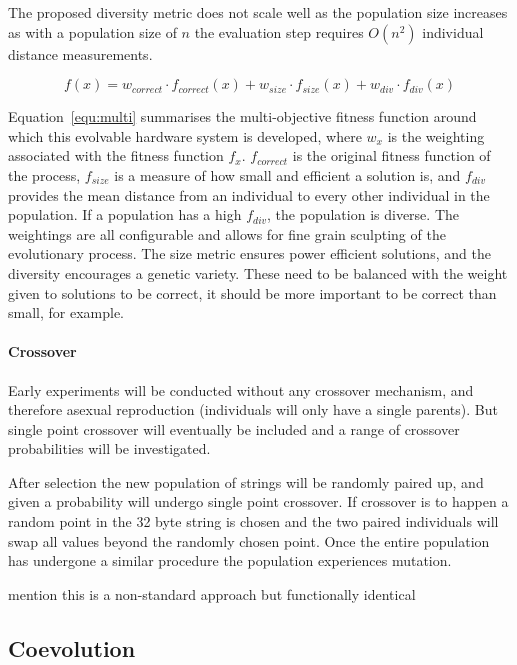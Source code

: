 The proposed diversity metric does not scale well as the population size increases
as with a population size of $n$ the evaluation step requires $O(n^2)$ individual
distance measurements.

\begin{equation}
	\label{equ:multi}
	f(x) = w_{correct} \cdot f_{correct}(x) + w_{size} \cdot f_{size}(x) +
	w_{div} \cdot f_{div}(x)
\end{equation}

Equation~\ref{equ:multi} summarises the multi-objective fitness function around
which this evolvable hardware system is developed, where $w_x$ is the weighting
associated with the fitness function $f_x$. $f_{correct}$ is the original fitness
function of the process, $f_{size}$ is a measure of how small and efficient a
solution is, and $f_{div}$ provides the mean distance from an individual to
every other individual in the population. If a population has a high $f_{div}$,
the population is diverse.
The weightings are all
configurable and allows for fine grain sculpting of the evolutionary process.
The size metric ensures power efficient solutions, and the diversity encourages
a genetic variety. These need to be balanced with the weight given to solutions
to be correct, it should be more important to be correct than small, for example.

\paragraph{Crossover}
Early experiments will be conducted without any crossover mechanism, and therefore
asexual reproduction (individuals will only have a single parents). But single
point crossover will eventually be included and a range of crossover probabilities
will be investigated.

After selection the new population of strings will be randomly paired up, and given
a probability will undergo single point crossover. If crossover is to happen a
random point in the 32 byte string is chosen and the two paired individuals will
swap all values beyond the randomly chosen point. Once the entire population has
undergone a similar procedure the population experiences mutation.

\todo mention this is a non-standard approach but functionally identical

\subsection{Coevolution}

